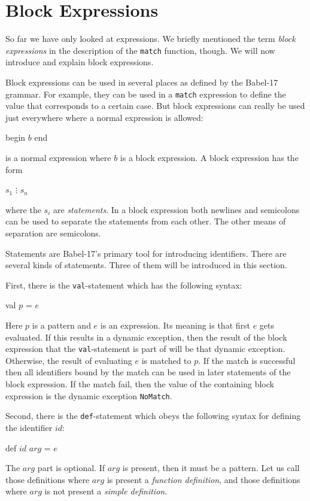 \documentclass[11pt]{amsart}
\newcommand{\babelsrc}[1] {\lstinline!#1!}
\begin{document}
\section{Block Expressions}
So far we have only looked at expressions. We briefly mentioned the term \emph{block expressions} in the description of the \babelsrc{match} function, though.  We will now introduce and explain block expressions.

Block expressions can be used in several places as defined by the Babel-17 grammar. For example, they can be used in a \babelsrc{match} expression to define the value that corresponds to a certain case. But block expressions can really be used just everywhere where a normal expression is allowed: 
\begin{babellisting}
begin
  $b$
end
\end{babellisting}
is a normal expression where $b$ is a block expression. A block expression has the form
\begin{babellisting}
$s_1$
$\vdots$
$s_n$
\end{babellisting}
where the $s_i$ are \emph{statements}. In a block expression both newlines and semicolons can be used to separate the statements from each other. The other means of separation are semicolons.

Statements are Babel-17's primary tool for introducing identifiers. There are several kinds of statements. Three of them will be introduced in this section.

First, there is the \babelsrc{val}-statement which has the following syntax:
\begin{babellisting}
val $p$ = $e$
\end{babellisting}
Here $p$ is a pattern and $e$ is an expression. Its meaning is that first $e$ gets evaluated. If this results in a dynamic exception, then the result of the block expression that the \babelsrc{val}-statement is part of will be that dynamic exception. Otherwise, the result of evaluating $e$ is matched to $p$. If the match is successful then all identifiers bound by the match can be used in later statements of the block expression. If the match fail, then the value of the containing block expression is the dynamic exception \babelsrc{NoMatch}.

Second, there is the \babelsrc{def}-statement which obeys the following syntax for defining the identifier $id$:
\begin{babellisting}
def $id$ $arg$ = $e$
\end{babellisting}
The $arg$ part is optional. If $arg$ is present, then it must be a pattern. Let us call those definitions where $arg$ is present a \emph{function definition}, and those definitions where $arg$ is not present a \emph{simple definition}.  
\end{document}
